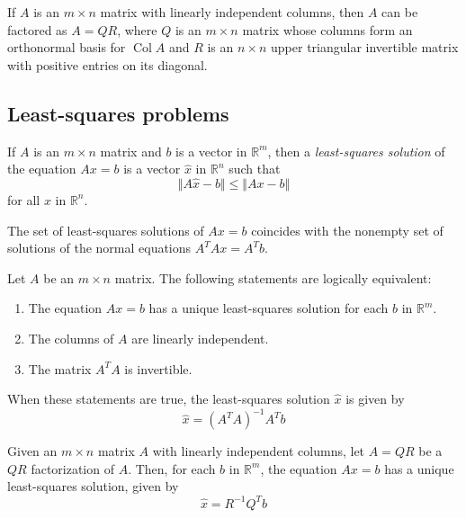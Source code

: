 \documentclass{article}
\DeclareMathOperator{\Col}{Col}
\begin{document}
\begin{thm} [QR factorization]
    If \(A\) is an \(m\times n\) matrix with linearly independent columns, then \(A\) can be factored as \(A=QR\), where \(Q\) is an \(m\times n\) matrix whose columns form an orthonormal basis for \(\Col A\) and \(R\) is an \(n\times n\) upper triangular invertible matrix with positive entries on its diagonal.
\end{thm}

\subsection{Least-squares problems}

\begin{defn}
    If \(A\) is an \(m\times n\) matrix and \(b\) is a vector in \(\mathbb{R}^m\), then a \emph{least-squares solution} of the equation \(Ax=b\) is a vector \(\hat{x}\) in \(\mathbb{R}^n\) such that \[\Vert A\hat{x}-b \Vert \leq \Vert Ax-b \Vert\] for all \(x\) in \(\mathbb{R}^n\).
\end{defn}

\begin{thm}
    The set of least-squares solutions of \(Ax=b\) coincides with the nonempty set of solutions of the normal equations \(A^TAx=A^Tb\).
\end{thm}

\begin{thm}
    Let \(A\) be an \(m\times n\) matrix. The following statements are logically equivalent:
    \begin{enumerate}
        \item[a.] The equation \(Ax=b\) has a unique least-squares solution for each \(b\) in \(\mathbb{R}^m\).
        \item[b.] The columns of \(A\) are linearly independent.
        \item[c.] The matrix \(A^TA\) is invertible.
    \end{enumerate}
When these statements are true, the least-squares solution \(\hat{x}\) is given by \[\hat{x}=(A^TA)^{-1}A^Tb\]
\end{thm}

\begin{thm}
    Given an \(m\times n\) matrix \(A\) with linearly independent columns, let \(A=QR\) be a \(QR\) factorization of \(A\). Then, for each \(b\) in \(\mathbb{R}^m\), the equation \(Ax=b\) has a unique least-squares solution, given by \[\hat{x}=R^{-1}Q^Tb\]
\end{thm}
\end{document}

